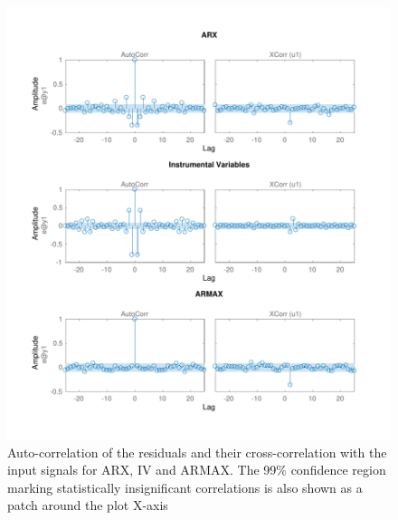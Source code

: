 \documentclass[a4paper,11pt]{article}
\begin{document}
\begin{figure}[H]
\centering
\includegraphics[width=\textwidth]{images/ce3_5_2_system_resid1}
\caption{Auto-correlation of the residuals and their cross-correlation with the input signals for ARX, IV and ARMAX. The 99\% confidence region marking statistically insignificant correlations is also shown as a patch around the plot X-axis}
\label{fig:syst_resid1}
\end{figure}
\end{document}
